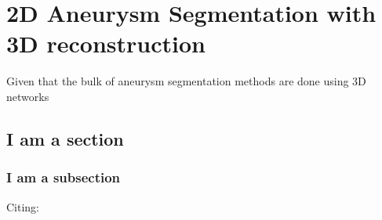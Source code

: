 \chapter{2D Aneurysm Segmentation with 3D reconstruction}
Given that the bulk of aneurysm segmentation methods are done using 3D networks


\section{I am a section}



\subsection{I am a subsection}

Citing: \cite{Sample2016}


